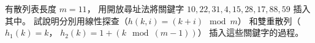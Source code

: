 \startEXERCISE
有散列表長度 $m=11$，
用開放尋址法將關鍵字
 $10,22,31,4,15,28,17,88,59$ 插入其中。
試說明分別用線性探查（$h(k,i)=(k+i)\mod m$）
和雙重散列（$h_1(k)=k$， $h_2(k)=1+(k\mod (m-1))$）
插入這些關鍵字的過程。
\stopEXERCISE

\startANSWER
\startcombination[2*1]
{\externalfigure[output/e11_4_1-1]}{}
{\externalfigure[output/e11_4_1-3]}{}
\stopcombination
\stopANSWER
